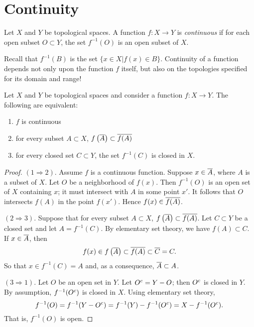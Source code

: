 \section{Continuity}

\begin{definition}
Let $X$ and $Y$ be topological spaces.
A function $f: X \rightarrow Y$ is \emph{continuous} if for each open subset $O \subset Y$, the set $f^{-1} (O)$ is an open subset of $X$.
\end{definition}

Recall that $f^{-1}(B)$ is the set $\{ x \in X | f(x) \in B \}$.
Continuity of a function depends not only upon the function $f$ itself, but also on the topologies specified for its domain and range!

\begin{theorem} \label{theorem:ContinuityEquivalentConditions}
Let $X$ and $Y$ be topological spaces and consider a function $f: X \rightarrow Y$.
The following are equivalent:
\begin{enumerate}
\item $f$ is continuous
\item for every subset $A \subset X$, $f \left( \overline{A} \right) \subset \overline{ f(A) }$
\item for every closed set $C \subset Y$, the set $f^{-1} (C)$ is closed in $X$.
\end{enumerate}
\end{theorem}
\begin{proof}
$(1 \Rightarrow 2)$.
Assume $f$ is a continuous function.
Suppose $x \in \overline{A}$, where $A$ is a subset of $X$.
Let $O$ be a neighborhood of $f(x)$.
Then $f^{-1}(O)$ is an open set of $X$ containing $x$; it must intersect with $A$ in some point $x'$.
It follows that $O$ intersects $f(A)$ in the point $f(x')$.
Hence $f(x) \in \overline{ f(A) }$.

$(2 \Rightarrow 3)$.
Suppose that for every subset $A \subset X$, $f \left( \overline{A} \right) \subset \overline{ f(A) }$.
Let $C \subset Y$ be a closed set and let $A = f^{-1} (C)$.
By elementary set theory, we have $f(A) \subset C$.
If $x \in \overline{A}$, then
\begin{equation*}
f(x) \in f \left( \overline{A} \right) \subset \overline{f (A)} \subset \overline{C} = C.
\end{equation*}
So that $x \in f^{-1} (C) = A$ and, as a consequence, $\overline{A} \subset A$.

$(3 \Rightarrow 1)$.
Let $O$ be an open set in $Y$.
Let ${O}^{c} = Y - O$; then ${O}^{c}$ is closed in $Y$.
By assumption, $f^{-1} ({O}^{c})$ is closed in $X$.
Using elementary set theory,
\begin{equation*}
f^{-1} (O) = f^{-1} (Y - {O}^{c}) = f^{-1}(Y) - f^{-1}({O}^{c}) = X - f^{-1}({O}^{c}).
\end{equation*}
That is, $f^{-1} (O)$ is open.
\end{proof}

